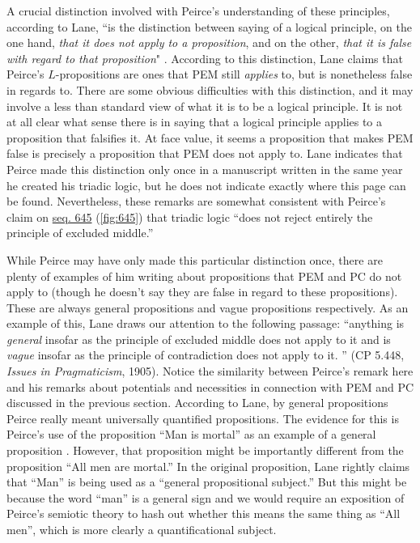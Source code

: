 A crucial distinction involved with Peirce's understanding of these principles, according to Lane, ``is the distinction between saying of a logical principle, on the one hand, \textit{that it does not apply to a proposition}, and on the other, \textit{that it is false with regard to that proposition}" \citep{lane_peirces_1999}. According to this distinction, Lane claims that Peirce's $L$-propositions are ones that PEM still \textit{applies} to, but is nonetheless false in regards to. There are some obvious difficulties with this distinction, and it may involve a less than standard view of what it is to be a logical principle. It is not at all clear what sense there is in saying that a logical principle applies to a proposition that falsifies it. At face value, it seems a proposition that makes PEM false is precisely a proposition that PEM does not apply to. Lane indicates that Peirce made this distinction only once in a manuscript written in the same year he created his triadic logic, but he does not indicate exactly where this page can be found. Nevertheless, these remarks are somewhat consistent with Peirce's claim on \href{https://iiif.lib.harvard.edu/manifests/view/drs:15255301$645i}{seq. 645} (\ref{fig:645}) that triadic logic ``does not reject entirely the principle of excluded middle.''

While Peirce may have only made this particular distinction once, there are plenty of examples of him writing about propositions that PEM and PC do not apply to (though he doesn't say they are false in regard to these propositions). These are always general propositions and vague propositions respectively. As an example of this, Lane draws our attention to the following passage: ``anything is \textit{general} insofar as the principle of excluded middle does not apply to it and is \textit{vague} insofar as the principle of contradiction does not apply to it. '' (CP 5.448, \textit{Issues in Pragmaticism}, 1905). Notice the similarity between Peirce's remark here and his remarks about potentials and necessities in connection with PEM and PC discussed in the previous section. According to Lane, by general propositions Peirce really meant universally quantified propositions. The evidence for this is Peirce's use of the proposition ``Man is mortal'' as an example of a general proposition \citep{lane_peirces_1999}. However, that proposition might be importantly different from the proposition ``All men are mortal.'' In the original proposition, Lane rightly claims that ``Man'' is being used as a ``general propositional subject.'' But this might be because the word ``man'' is a general sign and we would require an exposition of Peirce's semiotic theory to hash out whether this means the same thing as ``All men'', which is more clearly a quantificational subject.

